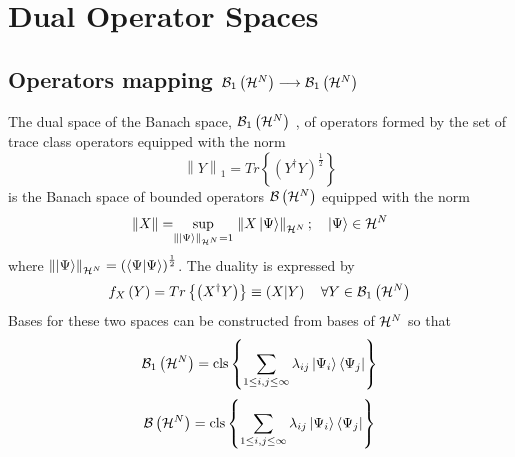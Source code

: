                       

\section{Dual Operator Spaces}

\subsection{Operators mapping ${\cal B}_{1}\left( {\cal H}^{N}\right)
\longrightarrow {\cal B}_{1}\left( {\cal H}^{N}\right) $}

The dual space of the Banach space, ${\cal B}_{1}\left( {\cal H}^{N}\right) $%
, of operators formed by the set of trace class operators equipped with the
norm%
\begin{equation}
\left\| Y\right\| _{1}=Tr\left\{ \left( Y^{\dagger }Y\right) ^{\frac{1}{2}%
}\right\}
\end{equation}%
is the Banach space of bounded operators ${\cal B}\left( {\cal H}^{N}\right) 
$ equipped with the norm%
\begin{equation}
\left\| X\right\| =%
\mathrel{\mathop{\sup }\limits_{\left\| \left| \Psi \right\rangle \right\| _{{\cal H}^{N}}=1}}%
\left\| X\left| \Psi \right\rangle \right\| _{{\cal H}^{N}};\quad \left|
\Psi \right\rangle \in {\cal H}^{N}
\end{equation}%
where $\left\| \left| \Psi \right\rangle \right\| _{{\cal H}^{N}}=\left(
\left\langle \Psi |\Psi \right\rangle \right) ^{\frac{1}{2}}$. The duality
is expressed by%
\begin{equation}
f_{X}\left( Y\right) =Tr\left\{ \left( X^{\dagger }Y\right) \right\} \equiv
\left( X|Y\right) \quad \forall Y\in {\cal B}_{1}\left( {\cal H}^{N}\right)
\end{equation}%
Bases for these two spaces can be constructed from bases of ${\cal H}^{N}$
so that 
\begin{equation}
{\cal B}_{1}\left( {\cal H}^{N}\right) ={\rm cls}\left\{ \sum\limits_{1\leq
i,j\leq \infty }\lambda _{ij}\left| \Psi _{i}\right\rangle \left\langle \Psi
_{j}\right| \right\}  \label{TCBasis}
\end{equation}%
\begin{equation}
{\cal B}\left( {\cal H}^{N}\right) ={\rm cls}\left\{ \sum_{1\leq i,j\leq
\infty }\lambda _{ij}\left| \Psi _{i}\right\rangle \left\langle \Psi
_{j}\right| \right\}  \label{BoundBasis}
\end{equation}%
